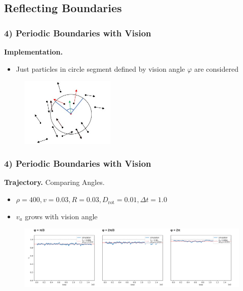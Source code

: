 \subsection{Reflecting Boundaries}

\begin{frame}
	\frametitle{4) Periodic Boundaries with Vision}
	\textbf{Implementation.}
	\begin{itemize}
	    \item Just particles in circle segment defined by vision angle $\varphi$ are considered
	\end{itemize}
	\begin{figure}[H]
  		\includegraphics[width=0.4\textwidth]{images/chapter4/particle_vision.jpeg} 
	\end{figure}
\end{frame}

\begin{frame}
	\frametitle{4) Periodic Boundaries with Vision}
	\textbf{Trajectory.} Comparing Angles.
	\begin{itemize}
	    \item $\rho = 400, v = 0.03, R = 0.03, D_{\text{rot}} = 0.01, \Delta t = 1.0$
	    \item $v_a$ grows with vision angle
	\end{itemize}
	\begin{figure}[H]
  		\includegraphics[width=\textwidth]{images/chapter4/trajectory_comp_N_20_L_1.000000_v_0.030000_R_0.030000_D_0.010000.png} 
	\end{figure}
\end{frame}

